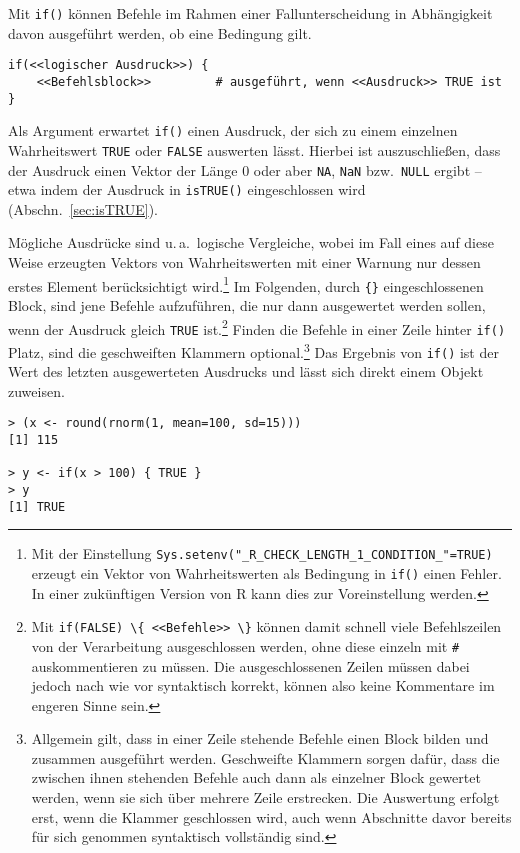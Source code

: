 Mit \lstinline!if()! können Befehle im Rahmen einer Fallunterscheidung in Abhängigkeit davon ausgeführt werden, ob eine Bedingung gilt.
\begin{lstlisting}
if(<<logischer Ausdruck>>) {
    <<Befehlsblock>>         # ausgeführt, wenn <<Ausdruck>> TRUE ist
}
\end{lstlisting}

Als Argument erwartet \lstinline!if()! einen Ausdruck, der sich zu einem einzelnen Wahrheitswert \lstinline!TRUE! oder \lstinline!FALSE! auswerten lässt. Hierbei ist auszuschließen, dass der Ausdruck einen Vektor der Länge 0 oder aber \lstinline!NA!, \lstinline!NaN! bzw.\ \lstinline!NULL! ergibt -- etwa indem der Ausdruck in \lstinline!isTRUE()! eingeschlossen wird (Abschn.\ \ref{sec:isTRUE}).

Mögliche Ausdrücke sind u.\,a.\ logische Vergleiche, wobei im Fall eines auf diese Weise erzeugten Vektors von Wahrheitswerten mit einer Warnung nur dessen erstes Element berücksichtigt wird.\footnote{\label{ftn:check_len_one}Mit der Einstellung \lstinline!Sys.setenv("_R_CHECK_LENGTH_1_CONDITION_"=TRUE)! erzeugt ein Vektor von Wahrheitswerten als Bedingung in \lstinline!if()! einen Fehler. In einer zukünftigen Version von R kann dies zur Voreinstellung werden.} Im Folgenden, durch \lstinline!{}! eingeschlossenen Block, sind jene Befehle aufzuführen, die nur dann ausgewertet werden sollen, wenn der Ausdruck gleich \lstinline!TRUE! ist.\footnote{Mit \lstinline!if(FALSE) \{ <<Befehle>> \}! können damit schnell viele Befehlszeilen von der Verarbeitung ausgeschlossen werden, ohne diese einzeln mit \lstinline!#! auskommentieren zu müssen. Die ausgeschlossenen Zeilen müssen dabei jedoch nach wie vor syntaktisch korrekt, können also keine Kommentare im engeren Sinne sein.} Finden die Befehle in einer Zeile hinter \lstinline!if()! Platz, sind die geschweiften Klammern optional.\footnote{Allgemein gilt, dass in einer Zeile stehende Befehle einen Block bilden und zusammen ausgeführt werden. Geschweifte Klammern sorgen dafür, dass die zwischen ihnen stehenden Befehle auch dann als einzelner Block gewertet werden, wenn sie sich über mehrere Zeile erstrecken. Die Auswertung erfolgt erst, wenn die Klammer geschlossen wird, auch wenn Abschnitte davor bereits für sich genommen syntaktisch vollständig sind.} Das Ergebnis von \lstinline!if()! ist der Wert des letzten ausgewerteten Ausdrucks und lässt sich direkt einem Objekt zuweisen.
\begin{lstlisting}
> (x <- round(rnorm(1, mean=100, sd=15)))
[1] 115

> y <- if(x > 100) { TRUE }
> y
[1] TRUE
\end{lstlisting}

